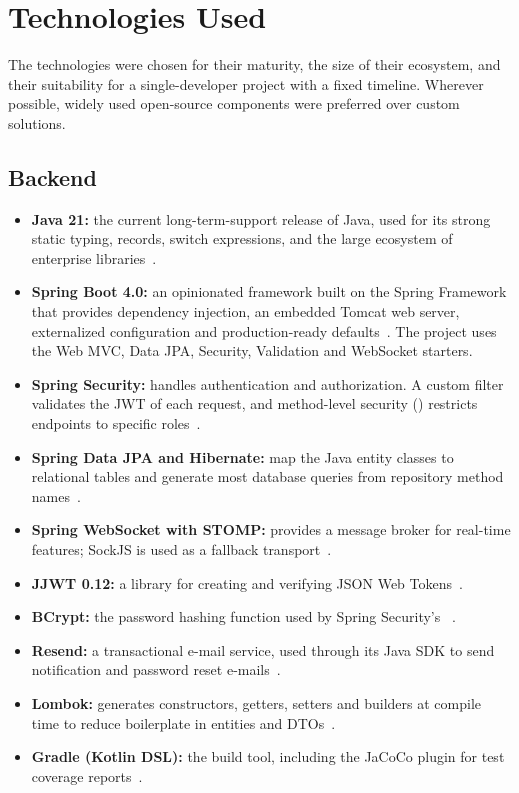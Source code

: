 \section{Technologies Used}

The technologies were chosen for their maturity, the size of their ecosystem, and
their suitability for a single-developer project with a fixed timeline. Wherever
possible, widely used open-source components were preferred over custom solutions.

\subsection*{Backend}

\begin{itemize}
  \item \textbf{Java 21:} the current long-term-support release of Java, used for its
    strong static typing, records, switch expressions, and the large ecosystem of
    enterprise libraries~\cite{java}.
  \item \textbf{Spring Boot 4.0:} an opinionated framework built on the Spring Framework
    that provides dependency injection, an embedded Tomcat web server, externalized
    configuration and production-ready defaults~\cite{springboot}. The project uses the
    Web MVC, Data JPA, Security, Validation and WebSocket starters.
  \item \textbf{Spring Security:} handles authentication and authorization. A custom
    filter validates the JWT of each request, and method-level security
    () restricts endpoints to specific roles~\cite{springsecurity}.
  \item \textbf{Spring Data JPA and Hibernate:} map the Java entity classes to
    relational tables and generate most database queries from repository method
    names~\cite{springdatajpa,hibernate}.
  \item \textbf{Spring WebSocket with STOMP:} provides a message broker for real-time
    features; SockJS is used as a fallback transport~\cite{springwebsocket,stomp}.
  \item \textbf{JJWT 0.12:} a library for creating and verifying JSON Web
    Tokens~\cite{jjwt,jwt}.
  \item \textbf{BCrypt:} the password hashing function used by Spring Security's
    ~\cite{bcrypt}.
  \item \textbf{Resend:} a transactional e-mail service, used through its Java SDK to
    send notification and password reset e-mails~\cite{resend}.
  \item \textbf{Lombok:} generates constructors, getters, setters and builders at compile
    time to reduce boilerplate in entities and DTOs~\cite{lombok}.
  \item \textbf{Gradle (Kotlin DSL):} the build tool, including the JaCoCo plugin for
    test coverage reports~\cite{gradle,jacoco}.
\end{itemize}

